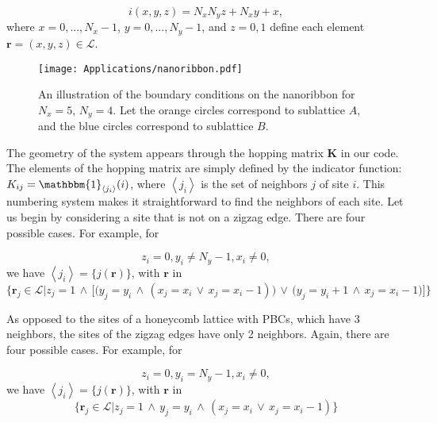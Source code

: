 \begin{equation}\label{eq:numbering}
i (x, y, z) = N_x N_y z + N_x y + x,
\end{equation}
where $x = 0, ..., N_x - 1$, $y = 0, ..., N_y - 1$, and $z = 0, 1$ define each element $\bm r = (x, y, z) \in \mathcal{L}$.

\begin{figure}[H]
	\centering
\texttt{[image: Applications/nanoribbon.pdf]}
	\caption[Boundary conditions on the nanoribbon.]{An illustration of the boundary conditions on the nanoribbon for $N_x = 5, \, N_y = 4$. Let the orange circles correspond to sublattice $A$, and the blue circles correspond to sublattice $B$.}
	\label{fig:nanoribbon}
\end{figure}

The geometry of the system appears through the hopping matrix $\bm K$ in our code.
The elements of the hopping matrix are simply defined by the indicator function: $K_{ij} = \mathbbm{1}_{\left\langle j_i \right\rangle} (i)$, where $\left\langle j_i \right\rangle$ is the set of neighbors $j$ of site $i$.
This numbering system makes it straightforward to find the neighbors of each site.
Let us begin by considering a site that is not on a zigzag edge.
There are four possible cases. For example, for 

\begin{equation*}
z_i = 0, y_i \neq N_y - 1, x_i \neq 0 ,
\end{equation*}
we have $\left\langle j_i \right\rangle = \{ j ( \bm r) \}$, with $\bm r$ in
\begin{equation*}
\bigg\{ \bm r_j \in \mathcal{L} \bigg| z_j = 1 \,\land\, \bigg[ \bigg( y_j = y_i  \,\land\, ( x_j = x_i \,\lor\, x_j = x_i - 1) \bigg) \,\lor\, \bigg( y_j = y_i + 1  \,\land\, x_j = x_i - 1  \bigg)  \bigg] \bigg\}
\end{equation*}

As opposed to the sites of a honeycomb lattice with \acp{PBC}, which have 3 neighbors, the sites of the zigzag edges have only 2 neighbors.
Again, there are four possible cases. For example, for 

\begin{equation*}
z_i = 0, y_i = N_y - 1, x_i \neq 0 ,
\end{equation*}
we have $\left\langle j_i \right\rangle = \{ j ( \bm r) \}$, with $\bm r$ in
\begin{equation*}
\bigg\{ \bm r_j \in \mathcal{L} \bigg| z_j = 1 \,\land\, y_j = y_i  \,\land\, ( x_j = x_i \,\lor\, x_j = x_i - 1) \bigg\}
\end{equation*}

